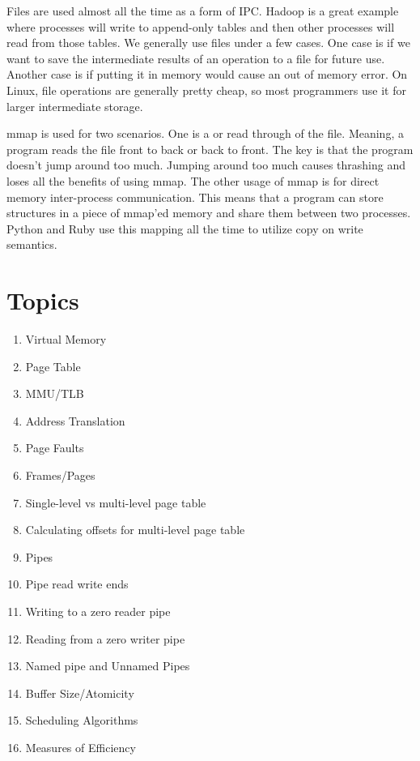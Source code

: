 Files are used almost all the time as a form of IPC.
Hadoop is a great example where processes will write to append-only tables and then other processes will read from those tables.
We generally use files under a few cases.
One case is if we want to save the intermediate results of an operation to a file for future use.
Another case is if putting it in memory would cause an out of memory error.
On Linux, file operations are generally pretty cheap, so most programmers use it for larger intermediate storage.
	 
mmap is used for two scenarios.
One is a  or  read through of the file.
Meaning, a program reads the file front to back or back to front.
The key is that the program doesn't jump around too much.
Jumping around too much causes thrashing and loses all the benefits of using mmap.
The other usage of mmap is for direct memory inter-process communication.
This means that a program can store structures in a piece of mmap'ed memory and share them between two processes.
Python and Ruby use this mapping all the time to utilize copy on write semantics.
	 
\section{Topics}
	 
\begin{enumerate}
	\item Virtual Memory
	\item Page Table
	\item MMU/TLB
	\item Address Translation
	\item Page Faults
	\item Frames/Pages
	\item Single-level vs multi-level page table
	\item Calculating offsets for multi-level page table
	\item Pipes
	\item Pipe read write ends
	\item Writing to a zero reader pipe
	\item Reading from a zero writer pipe
	\item Named pipe and Unnamed Pipes
	\item Buffer Size/Atomicity
	\item Scheduling Algorithms
	\item Measures of Efficiency
\end{enumerate}
	 
